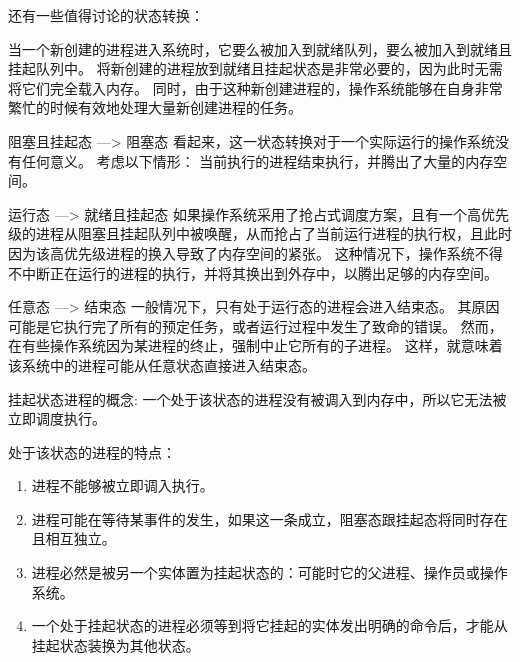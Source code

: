 {{{{                还有一些值得讨论的状态转换：

                \begin{description}
                    \item[新创建态 ---> 就绪且挂起态及新创建态 ---> 就绪态]
                    {
                        当一个新创建的进程进入系统时，它要么被加入到就绪队列，要么被加入到就绪且挂起队列中。
                        将新创建的进程放到就绪且挂起状态是非常必要的，因为此时无需将它们完全载入内存。
                        同时，由于这种新创建进程的，操作系统能够在自身非常繁忙的时候有效地处理大量新创建进程的任务。
                    }
                    \item{阻塞且挂起态 ---> 阻塞态}
                    {
                        看起来，这一状态转换对于一个实际运行的操作系统没有任何意义。
                        考虑以下情形：
                        当前执行的进程结束执行，并腾出了大量的内存空间。
                    }
                    \item{运行态 ---> 就绪且挂起态}
                    {
                        如果操作系统采用了抢占式调度方案，且有一个高优先级的进程从阻塞且挂起队列中被唤醒，从而抢占了当前运行进程的执行权，且此时因为该高优先级进程的换入导致了内存空间的紧张。
                        这种情况下，操作系统不得不中断正在运行的进程的执行，并将其换出到外存中，以腾出足够的内存空间。
                    }
                    \item{任意态 ---> 结束态}
                    {
                        一般情况下，只有处于运行态的进程会进入结束态。
                        其原因可能是它执行完了所有的预定任务，或者运行过程中发生了致命的错误。
                        然而，在有些操作系统因为某进程的终止，强制中止它所有的子进程。
                        这样，就意味着该系统中的进程可能从任意状态直接进入结束态。
                    }
                \end{description}
            }

            {
                挂起状态进程的概念:
                一个处于该状态的进程没有被调入到内存中，所以它无法被立即调度执行。

                处于该状态的进程的特点：

                \begin{enumerate}
                    \item 进程不能够被立即调入执行。
                    \item 进程可能在等待某事件的发生，如果这一条成立，阻塞态跟挂起态将同时存在且相互独立。
                    \item 进程必然是被另一个实体置为挂起状态的：可能时它的父进程、操作员或操作系统。
                    \item 一个处于挂起状态的进程必须等到将它挂起的实体发出明确的命令后，才能从挂起状态装换为其他状态。
                \end{enumerate}

}}}}

